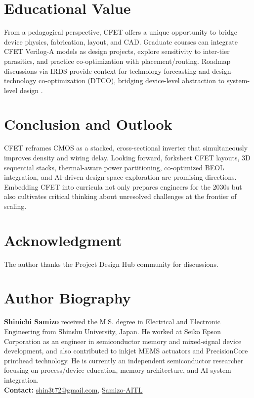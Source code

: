 \documentclass[conference]{IEEEtran}
\begin{document}
\section{Educational Value}
From a pedagogical perspective, CFET offers a unique opportunity to bridge device physics, fabrication, layout, and CAD.
Graduate courses can integrate CFET Verilog-A models as design projects, explore sensitivity to inter-tier parasitics, and practice co-optimization with placement/routing.
Roadmap discussions via IRDS provide context for technology forecasting and design-technology co-optimization (DTCO), bridging device-level abstraction to system-level design \cite{irds_2023}.

\section{Conclusion and Outlook}
CFET reframes CMOS as a stacked, cross-sectional inverter that simultaneously improves density and wiring delay.
Looking forward, forksheet CFET layouts, 3D sequential stacks, thermal-aware power partitioning, co-optimized BEOL integration, and AI-driven design-space exploration are promising directions.
Embedding CFET into curricula not only prepares engineers for the 2030s but also cultivates critical thinking about unresolved challenges at the frontier of scaling.

\section*{Acknowledgment}
The author thanks the Project Design Hub community for discussions.




\section*{Author Biography}
\noindent\textbf{Shinichi Samizo}
received the M.S. degree in Electrical and Electronic Engineering from Shinshu University, Japan.
He worked at Seiko Epson Corporation as an engineer in semiconductor memory and mixed-signal device development, and also contributed to inkjet MEMS actuators and PrecisionCore printhead technology.
He is currently an independent semiconductor researcher focusing on process/device education, memory architecture, and AI system integration.\\[2pt]
\textbf{Contact:} \href{mailto:shin3t72@gmail.com}{shin3t72@gmail.com}, \href{https://github.com/Samizo-AITL}{Samizo-AITL}
\end{document}
